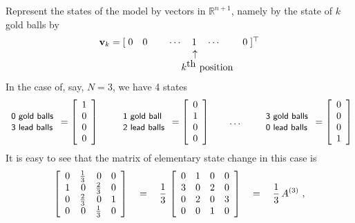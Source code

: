 \documentclass[12pt]{article}
\numberwithin{equation}{section}
\begin{document}
Represent the states of the model by vectors in $\mathbb{R}^{n+1}$, 
namely by the state of $k$ gold balls by
\begin{equation}\label{e:states}
\begin{array}{rrcl}
\mathbf{v}_k = [\;0 & 0 &  \cdots  \quad 1 \quad \cdots & 0 \;]^\top \\
  &   & \uparrow \\
  &   & \hbox to 25pt{} k^{\hbox{th}}\hbox{ position}
\end{array}
\end{equation}  
In the case of, say, $N=3$, we have 4 states
$$
\begin{array}{l} \hbox{\small \textsf{0 gold balls}}\\ 
                 \hbox{\small \textsf{3 lead balls}}  \end{array}
   = \left[ \begin{array}{c} 1 \\ 0 \\ 0 \\ 0  \end{array}\right]
\qquad
\begin{array}{l} \hbox{\small\textsf{1 gold ball}}\\ 
                 \hbox{\small\textsf{2 lead balls}} \end{array}
   = \left[ \begin{array}{c} 0 \\ 1 \\ 0 \\ 0 \end{array}\right]
\qquad
\ldots
\qquad
\begin{array}{l} \hbox{\small\textsf{3 gold balls}}\\ 
                 \hbox{\small\textsf{0 lead balls}}  \end{array}
   =  \left[ \begin{array}{c} 0 \\ 0 \\ 0 \\ 1  \end{array}\right]
$$
It is easy to see that the matrix of elementary state change in this case 
is
$$
  \left[\begin{array}{rrrr} 
                0 & \frac{1}{3} & 0 & 0 \cr
                1 & 0 & \frac{2}{3} & 0 \cr
                0 & \frac{2}{3} & 0 & 1 \cr
                0 & 0 & {1\over3} & 0 \cr \end{array}\right]
\quad = \quad 
\frac{1}{3}\,
  \left[\begin{array}{rrrr} 
                0 & 1 & 0 & 0 \cr
                3 & 0 & 2 & 0 \cr
                0 & 2 & 0 & 3 \cr
                0 & 0 & 1 & 0 \cr \end{array}\right]
\quad = \quad\frac{1}{3}\, A^{(3)} \ ,
$$ 
\end{document}
